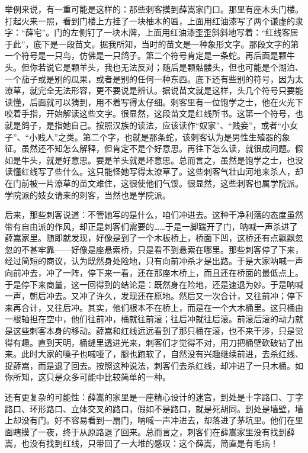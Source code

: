 举例来说，有一重可能是这样的：那些刺客摸到薛嵩家门口。那里有座木头门楼。打起火来一照，看到门楼上方挂了一块柚木的匾，上面用红油漆写了两个谦虚的隶字：“薛宅”。门的左侧钉了一块木牌，上面用红油漆歪歪斜斜地写着：“红线客居于此”，底下是一段苗文。据我所知，当时的苗文是一种象形文字。那段文字的第一个符号是一只鸟，仿佛是一只鸽子。第二个符号肯定是一条蛇。再后面是颗牛头。但你若说它是颗羊头，我也无法反对；随后是颗骷髅头，但也可能是个湖泊、一个茄子或是别的瓜果，或者是别的任何一种东西。底下还有些别的符号，因为太潦草，就完全无法形容，更不要说是辨认。据说苗文就是这样，头几个符号只要能读懂，后面就可以猜到，用不着写得太仔细。刺客里有一位饱学之士，他在火光下咬着手指，开始解读这些文字。很显然，这段苗文是红线所书。这第一个符号，也就是鸽子，是指她自己。按照汉族的读法，应该读作“奴家”、“贱妾”，或者“小女子”、“小贱人”之类。第二个字，也就是那条蛇，该刺客认为是男性生殖器的象征。虽然还不知怎么解释，但肯定不是个好意思。再往下怎么读，就很成问题。假如是牛头，就是好意思。要是羊头就是坏意思。总而言之，虽然是饱学之士，也没读懂红线写了些什么。这只能怪她写得太潦草了。这些刺客气壮山河地来杀人，却在门前被一片潦草的苗文难住，这很使他们气馁。很显然，这些刺客也属学院派。学院派的妓女请来的刺客，当然也是学院派。 

后来，那些刺客说道：不管她写的是什么，咱们冲进去。这种干净利落的态度虽然带有自由派的作风，却正是刺客们需要的……于是一脚踹开了门，呐喊一声杀进了薛嵩家里。随即就发现，好像是到了一个木板桥上，桥面下凹，这桥还有点飘飘忽忽的不甚牢靠——好像是座悬索桥，只是看不到悬索在哪里。那些刺客停了下来，经过简短的商议，认为既然身处险地，只有向前冲杀才是出路。于是大家呐喊一声向前冲去，冲了一阵，停下来一看，还在那座木桥上，而且还在桥面的最低点上。于是停下来商量，这一回得到的结论是：既然身在险地，还是速退为妙。于是呐喊一声，朝后冲去。又冲了许久，发现还在原地。然后又一次合计，又往前冲；停下来再合计，又往后冲。其实，他们根本不在桥上，而是在一个大木桶里。这只桶由一根轴担在空中，他们往前冲，桶就往前滚；往后冲就往后滚。前滚后滚的动力就是这些刺客本身的移动。薛嵩和红线远远看到了那只桶在滚，也不来干涉，只是觉得有趣。直到天明，桶缝里透进光来，刺客们才觉得不对，用刀把桶壁砍破钻了出来。此时大家的嗓子也喊哑了，腿也跑软了，自然没有兴趣继续前进，去杀红线、捉薛嵩，而是退了回去。按照这种说法，刺客们去杀红线，却冲进了一只木桶。如你所知，这只是众多可能中比较简单的一种。 

还有更复杂的可能性：薛嵩的家里是一座精心设计的迷宫，到处是十字路口、丁字路口、环形路口、立体交叉的路口，假如不是路口，就是死胡同。到处是墙壁，墙上却没有门。好不容易看到一扇门，呐喊一声冲进去，却落进了茅坑里。他们在里面瞎摸了一夜，终于从原路退了回来。总而言之，刺客们在薛嵩家里没有找到薛嵩，也没有找到红线，只带回了一大堆的感叹：这个薛嵩，简直是有毛病！ 

